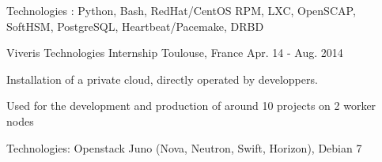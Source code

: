 \begin{cventries}
{\begin{cvitems}
    \item {Technologies : Python, Bash, RedHat/CentOS RPM, LXC, OpenSCAP, SoftHSM, PostgreSQL, Heartbeat/Pacemake, DRBD}
  \end{cvitems}
  }
  \cventry
  {Viveris Technologies}
  {Internship}
  {Toulouse, France}
  {Apr. 14 - Aug. 2014}
  {
  \begin{cvitems}
    \item {Installation of a private cloud, directly operated by developpers.}
    \item {Used for the development and production of around 10 projects on 2 worker nodes}
    \item {Technologies: Openstack Juno (Nova, Neutron, Swift, Horizon), Debian 7}
  \end{cvitems}
  }
\end{cventries}
